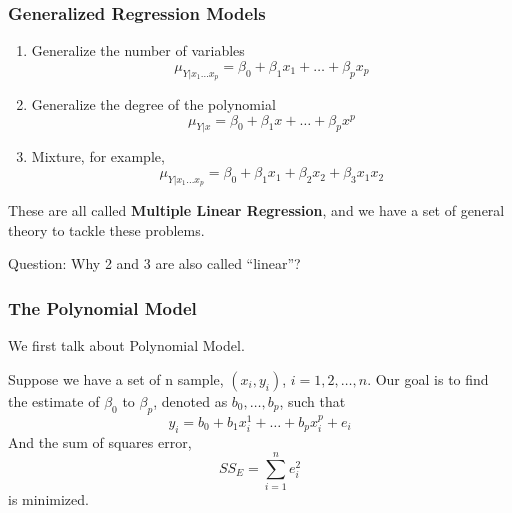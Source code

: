 \documentclass{beamer}
\begin{document}
\begin{frame}
    \frametitle{Generalized Regression Models}
    \begin{enumerate}
        \item Generalize the number of variables
        \[\mu_{Y|x_1\dots x_p}=\beta_0+\beta_1 x_1+\dots +\beta_p x_p\]
        \item Generalize the degree of the polynomial
        \[\mu_{Y|x}=\beta_0+\beta_1 x+\dots +\beta_p x^p\]
        \item Mixture, for example, 
        \[\mu_{Y|x_1\dots x_p}=\beta_0+\beta_1 x_1+\beta_2 x_2+\beta_3 x_1 x_2\]
    \end{enumerate}
    These are all called \textbf{Multiple Linear Regression}, and we have a set of general theory to tackle these problems.\par
    Question: Why 2 and 3 are also called ``linear''?
    

\end{frame}

\begin{frame}
    \frametitle{The Polynomial Model}

    We first talk about Polynomial Model.\par
    Suppose we have a set of n sample, $(x_i,y_i)$, $i=1,2,\dots , n$. Our goal is to find the estimate of $\beta_0$ to $\beta_p$, denoted as $b_0, \dots , b_p$, such that
    \[y_i=b_0+b_1 x_{i}^1+\dots +b_p x_i^p+e_i\]
    And the sum of squares error, 
    \[SS_{E}=\sum\limits_{i=1}^{n} e_i^2\]
    is minimized.

\end{frame}
\end{document}
